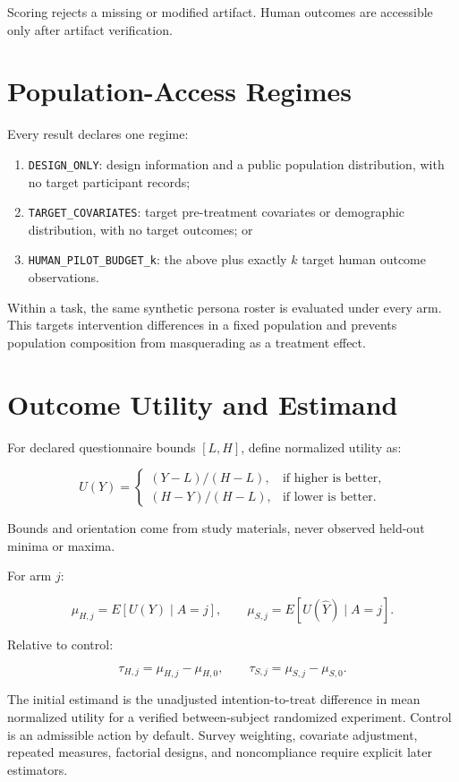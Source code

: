 \documentclass[11pt]{article}
\begin{document}
Scoring rejects a missing or modified artifact. Human outcomes are accessible only after artifact verification.

\section{Population-Access Regimes}

Every result declares one regime:

\begin{enumerate}
\item \texttt{DESIGN\_ONLY}: design information and a public population distribution, with no target participant records;
\item \texttt{TARGET\_COVARIATES}: target pre-treatment covariates or demographic distribution, with no target outcomes; or
\item \texttt{HUMAN\_PILOT\_BUDGET\_k}: the above plus exactly $k$ target human outcome observations.
\end{enumerate}

Within a task, the same synthetic persona roster is evaluated under every arm. This targets intervention differences in a fixed population and prevents population composition from masquerading as a treatment effect.

\section{Outcome Utility and Estimand}

For declared questionnaire bounds $[L,H]$, define normalized utility as:

\[
U(Y)=
\begin{cases}
(Y-L)/(H-L), & \text{if higher is better},\\
(H-Y)/(H-L), & \text{if lower is better}.
\end{cases}
\]

Bounds and orientation come from study materials, never observed held-out minima or maxima.

For arm $j$:

\[
\mu_{H,j}=E[U(Y)\mid A=j], \qquad
\mu_{S,j}=E[U(\hat{Y})\mid A=j].
\]

Relative to control:

\[
\tau_{H,j}=\mu_{H,j}-\mu_{H,0}, \qquad
\tau_{S,j}=\mu_{S,j}-\mu_{S,0}.
\]

The initial estimand is the unadjusted intention-to-treat difference in mean normalized utility for a verified between-subject randomized experiment. Control is an admissible action by default. Survey weighting, covariate adjustment, repeated measures, factorial designs, and noncompliance require explicit later estimators.
\end{document}
